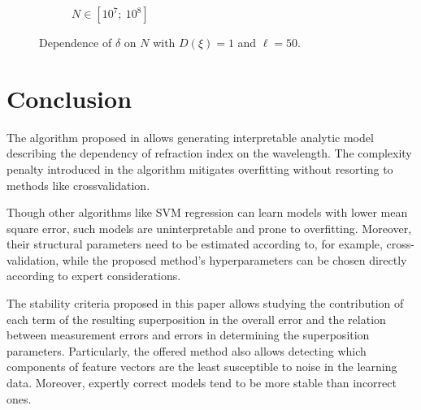\documentclass[11pt,a4paper]{article}
\theoremstyle{definition}
\begin{document}
\begin{figure}[h!]
\begin{subfigure}[b]{0.3\textwidth}
    \caption{$N \in [10^7;~10^8]$}
    \label{fig:classic_var1_n50_end}
  \end{subfigure}
  \caption{Dependence of $\delta$ on $N$ with $D(\xi) = 1$ and $\ell = 50$.}
  \label{fig:classic_var1_n50}
\end{figure}

\section{Conclusion}

The algorithm proposed in \citep{Rudoy13} allows generating interpretable analytic
model describing the dependency of refraction index on the wavelength. The complexity
penalty introduced in the algorithm mitigates overfitting without resorting to methods
like crossvalidation.

Though other algorithms like SVM regression can learn models with lower mean square error,
such models are uninterpretable and prone to overfitting. Moreover, their
structural parameters need to be estimated according to, for example,
cross-validation, while the proposed method's hyperparameters can be chosen directly
according to expert considerations.

The stability criteria proposed in this paper allows studying the contribution of each
term of the resulting superposition in the overall error
and the relation between measurement errors
and errors in determining the superposition parameters. Particularly, the offered method
also allows detecting which components of feature vectors are the least susceptible to
noise in the learning data. Moreover, expertly correct models tend to be more stable
than incorrect ones.

\FloatBarrier

%
%
%

\end{document}
